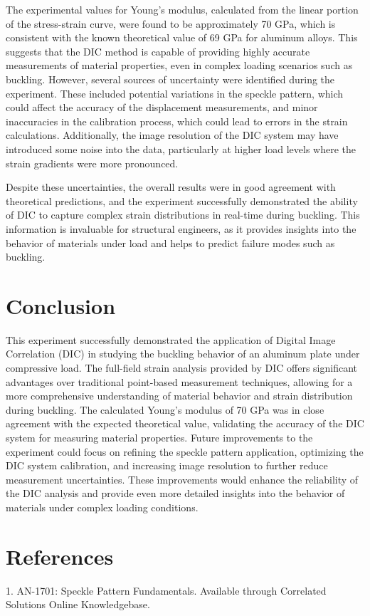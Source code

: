 \documentclass[11pt]{article}
\begin{document}
The experimental values for Young’s modulus, calculated from the linear portion of the stress-strain curve, were found to be approximately 70 GPa, which is consistent with the known theoretical value of 69 GPa for aluminum alloys. This suggests that the DIC method is capable of providing highly accurate measurements of material properties, even in complex loading scenarios such as buckling. However, several sources of uncertainty were identified during the experiment. These included potential variations in the speckle pattern, which could affect the accuracy of the displacement measurements, and minor inaccuracies in the calibration process, which could lead to errors in the strain calculations. Additionally, the image resolution of the DIC system may have introduced some noise into the data, particularly at higher load levels where the strain gradients were more pronounced.

Despite these uncertainties, the overall results were in good agreement with theoretical predictions, and the experiment successfully demonstrated the ability of DIC to capture complex strain distributions in real-time during buckling. This information is invaluable for structural engineers, as it provides insights into the behavior of materials under load and helps to predict failure modes such as buckling.

\section*{Conclusion}
This experiment successfully demonstrated the application of Digital Image Correlation (DIC) in studying the buckling behavior of an aluminum plate under compressive load. The full-field strain analysis provided by DIC offers significant advantages over traditional point-based measurement techniques, allowing for a more comprehensive understanding of material behavior and strain distribution during buckling. The calculated Young's modulus of 70 GPa was in close agreement with the expected theoretical value, validating the accuracy of the DIC system for measuring material properties. Future improvements to the experiment could focus on refining the speckle pattern application, optimizing the DIC system calibration, and increasing image resolution to further reduce measurement uncertainties. These improvements would enhance the reliability of the DIC analysis and provide even more detailed insights into the behavior of materials under complex loading conditions.

\newpage
\section*{References}
1. AN-1701: Speckle Pattern Fundamentals. Available through Correlated Solutions Online Knowledgebase.
\end{document}
